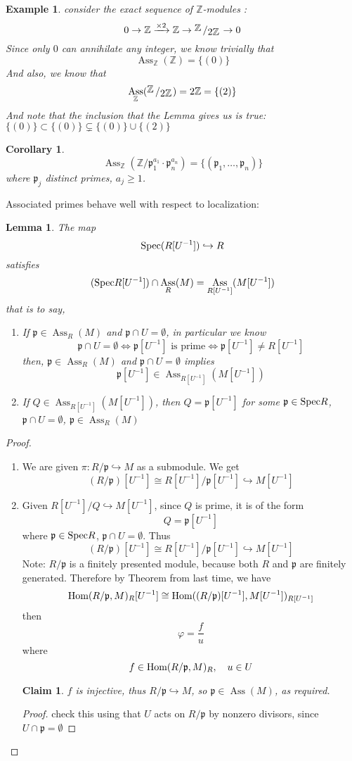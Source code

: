\documentclass[12pt]{article}
\newcommand{\z}{\mathbb{Z}}
\newcommand{\spec}{\textup{Spec}}
\newcommand{\ho}[2]{\textup{Hom}(#1,#2)}
\DeclareMathOperator{\Ass}{Ass}
\newcommand{\bigslant}[2]{{\raisebox{.2em}{$#1$}\left/\raisebox{-.2em}{$#2$}\right.}}
\newcommand\inv[1]{#1^{-1}}
\def\p{\mathfrak{p}}
\newtheorem{corollary}[theorem]{Corollary}
\newtheorem{lemma}[theorem]{Lemma}
\newtheorem*{claim}{Claim}
\newtheorem*{eg}{Example}
\theoremstyle{definition}
\begin{document}
\begin{eg}
consider the exact sequence of $\z$-modules :
\[
0 \rightarrow \z \xrightarrow{\times 2} \z \rightarrow \bigslant{\z}{2\z} \rightarrow 0
\]
Since only $0$ can annihilate any integer, we know trivially that
\[
\Ass_\z (\z) = \{(0)\}
\]
And also, we know that
\[
\Ass_\z (\bigslant{\z}{2\z}) = 2\z = \{(2)\}
\]
And note that the inclusion that the Lemma gives us is true: $\{(0)\} \subset\{(0)\} \subsetneq \{(0)\}\cup \{(2)\} $
\end{eg}
\begin{corollary}
\[
\Ass_\z (\z/\p_1^{a_1}\cdot \p_n^{a_n}) = \{(\p_1,\dots, \p_n)\}
\]
where $\p_j$ distinct primes, $a_j \geq 1$.
\end{corollary}
Associated primes behave well with respect to localization:
\begin{lemma}
The map
\[
\spec(R[\inv{U}]) \hookrightarrow R
\]
satisfies 
\[
(\spec{R[\inv{U}]})\cap \Ass_R(M) = \Ass_{R[\inv{U}]}(M[\inv{U}])
\]
that is to say,
\begin{enumerate}
    \item If $\p\in \Ass_R(M)$ and $\p\cap U = \emptyset$, in particular we know
    \[
    \p\cap U = \emptyset \iff \p [U^{-1}] \text{ is prime} \iff \p[\inv{U}] \neq R[\inv{U}]
    \]
    then, $\p\in \Ass_R(M)$ and $\p\cap U = \emptyset$ implies
    \[
    \p[\inv{U}] \in \Ass_{R[\inv{U}]}(M[\inv{U}])
    \]
    \item If $Q \in \Ass_{R[\inv{U}]}(M[\inv{U}])$, then $Q = \p[\inv{U}]$ for some $\p \in \spec{R}$, $\p \cap U = \emptyset$, $\p \in \Ass_R(M)$
\end{enumerate}
\end{lemma}
\begin{proof}
\begin{enumerate}
    \item We are given $\pi: R/\p \hookrightarrow M$ as a submodule. We get 
    \[
    (R/\p)[U^{-1}]\cong R[\inv{U}]/\p[U^{-1}] \hookrightarrow M[U^{-1}]
    \]
    \item Given $R[U^{-1}]/Q \hookrightarrow M[\inv{U}]$, since $Q$ is prime, it is of the form 
    \[
    Q = \p[U^{-1}]
    \]
    where $\p \in \spec{R}$, $\p \cap U = \emptyset$. Thus
    \[
    (R/\p)[U^{-1}] \cong R[U^{-1}]/\p[U^{-1}] \hookrightarrow M[U^{-1}]
    \]
    Note: $R/\p$ is a finitely presented module, because both $R$ and $\p$ are finitely generated. Therefore by Theorem from last time, we have
    \[
    \ho{R/\p}{M}_R[U^{-1}] \cong \ho{(R/\p)[U^{-1}]}{M[U^{-1}]}_{R[U^{-1}]}
    \]
    then
    \[
    \varphi = \frac{f}{u}
    \]
    where
    \[
    f\in \ho{R/\p}{M}_R,\quad u\in U
    \]
    \begin{claim}
    $f$ is injective, thus $R/\p \hookrightarrow M$, so $\p \in \Ass(M)$, as required.
    \end{claim}
    \begin{proof}
    check this using that $U$ acts on $R/\p$ by nonzero divisors, since $U\cap \p = \emptyset$
    \end{proof}
\end{enumerate}
\end{proof}
\end{document}
